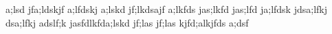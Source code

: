 a;lsd jfa;ldskjf a;lfdskj a;lskd jf;lkdsajf
a;lkfds jas;lkfd jas;lfd ja;lfdsk jdsa;lfkj
dsa;lfkj adslf;k jasfdlkfda;lskd jf;las jf;las
kjfd;alkjfds a;dsf
